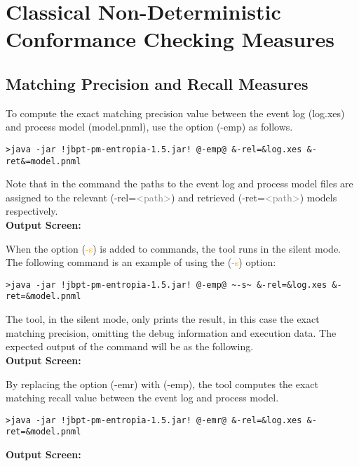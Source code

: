 \section*{Classical Non-Deterministic Conformance Checking Measures}
\setcounter{subsection}{0}
\subsection{Matching Precision and Recall Measures}
To compute the exact matching precision value between the event log (log.xes) and process model  (model.pnml), use the option (\textcolor{darkcandyapplered}{\footnotesize\ttfamily-emp}) as follows.
\begin{lstlisting}[style=CL]
>java -jar !jbpt-pm-entropia-1.5.jar! @-emp@ &-rel=&log.xes &-ret&=model.pnml
\end{lstlisting}
Note that in the command the paths to the event log and process model files are assigned to the relevant (\textcolor{ao}{\footnotesize\ttfamily-rel=}\textcolor{gray}{\footnotesize\ttfamily<path>}) and retrieved (\textcolor{ao}{\footnotesize\ttfamily-ret=}\textcolor{gray}{\footnotesize\ttfamily<path>}) models respectively.\\

\textbf{Output Screen:}%


When the option (\textcolor{orange}{\footnotesize\ttfamily-s}) is added to commands, the tool runs in the silent mode. The following command is an example of using the (\textcolor{orange}{\footnotesize\ttfamily-s}) option:
\begin{lstlisting}[style=CL]
>java -jar !jbpt-pm-entropia-1.5.jar! @-emp@ ~-s~ &-rel=&log.xes &-ret=&model.pnml
\end{lstlisting}
The tool, in the silent mode, only prints the result, in this case the exact matching precision, omitting the debug information and execution data. The expected output of the command will be as the following. \\
\textbf{Output Screen:}%


By replacing the option (\textcolor{darkcandyapplered}{\footnotesize\ttfamily-emr}) with (\textcolor{darkcandyapplered}{\footnotesize\ttfamily-emp}), the tool computes the exact matching recall value between the event log and process model. 

\begin{lstlisting}[style=CL]
>java -jar !jbpt-pm-entropia-1.5.jar! @-emr@ &-rel=&log.xes &-ret=&model.pnml
\end{lstlisting}
\textbf{Output Screen:}%


